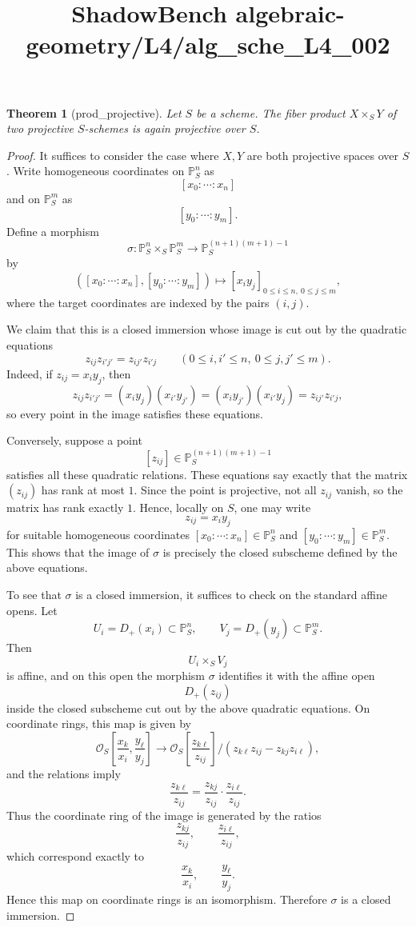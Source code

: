 \documentclass{article}
\title{ShadowBench algebraic-geometry/L4/alg\_sche\_L4\_002}
\newtheorem{theorem}{Theorem}
\begin{document}
\maketitle

\begin{theorem}[prod_projective]
Let $S$ be a scheme. The fiber product $X \times_S Y$ of two projective $S$-schemes is again projective over $S$.
\end{theorem}

\begin{proof}
It suffices to consider the case where $X, Y$ are both projective spaces over $S$. 
Write homogeneous coordinates on $\mathbb{P}^n_S$ as
\[
[x_0:\cdots:x_n]
\]
and on $\mathbb{P}^m_S$ as
\[
[y_0:\cdots:y_m].
\]
Define a morphism
\[
\sigma : \mathbb{P}^n_S \times_S \mathbb{P}^m_S \to \mathbb{P}^{(n+1)(m+1)-1}_S
\]
by
\[
([x_0:\cdots:x_n],[y_0:\cdots:y_m])
\longmapsto
[x_i y_j]_{0 \le i \le n,\ 0 \le j \le m},
\]
where the target coordinates are indexed by the pairs $(i,j)$.

We claim that this is a closed immersion whose image is cut out by the quadratic equations
\[
z_{ij} z_{i'j'} = z_{ij'} z_{i'j}
\qquad
(0 \le i,i' \le n,\ 0 \le j,j' \le m).
\]
Indeed, if $z_{ij} = x_i y_j$, then
\[
z_{ij} z_{i'j'} = (x_i y_j)(x_{i'} y_{j'}) = (x_i y_{j'})(x_{i'} y_j) = z_{ij'} z_{i'j},
\]
so every point in the image satisfies these equations.

Conversely, suppose a point
\[
[z_{ij}] \in \mathbb{P}^{(n+1)(m+1)-1}_S
\]
satisfies all these quadratic relations. These equations say exactly that the matrix $(z_{ij})$ has rank at most $1$. Since the point is projective, not all $z_{ij}$ vanish, so the matrix has rank exactly $1$. Hence, locally on $S$, one may write
\[
z_{ij} = x_i y_j
\]
for suitable homogeneous coordinates $[x_0:\cdots:x_n] \in \mathbb{P}^n_S$ and $[y_0:\cdots:y_m] \in \mathbb{P}^m_S$. This shows that the image of $\sigma$ is precisely the closed subscheme defined by the above equations.

To see that $\sigma$ is a closed immersion, it suffices to check on the standard affine opens. Let
\[
U_i = D_+(x_i) \subset \mathbb{P}^n_S, \qquad
V_j = D_+(y_j) \subset \mathbb{P}^m_S.
\]
Then
\[
U_i \times_S V_j
\]
is affine, and on this open the morphism $\sigma$ identifies it with the affine open
\[
D_+(z_{ij})
\]
inside the closed subscheme cut out by the above quadratic equations. On coordinate rings, this map is given by
\[
\mathcal{O}_S\!\left[\frac{x_k}{x_i}, \frac{y_\ell}{y_j}\right]
\longrightarrow
\mathcal{O}_S\!\left[\frac{z_{k\ell}}{z_{ij}}\right]/(z_{k\ell}z_{ij}-z_{kj}z_{i\ell}),
\]
and the relations imply
\[
\frac{z_{k\ell}}{z_{ij}}=
\frac{z_{kj}}{z_{ij}}\cdot \frac{z_{i\ell}}{z_{ij}}.
\]
Thus the coordinate ring of the image is generated by the ratios
\[
\frac{z_{kj}}{z_{ij}}, \qquad \frac{z_{i\ell}}{z_{ij}},
\]
which correspond exactly to
\[
\frac{x_k}{x_i}, \qquad \frac{y_\ell}{y_j}.
\]
Hence this map on coordinate rings is an isomorphism. Therefore $\sigma$ is a closed immersion.


\end{proof}
\end{document}
